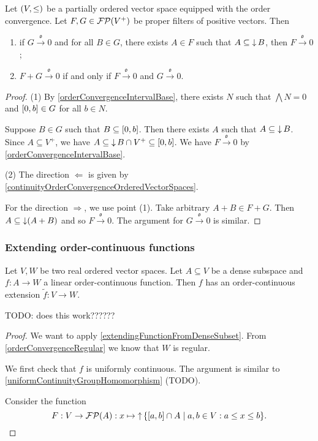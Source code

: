 \begin{lemma} \label{orderConvergencePositiveFilterLemma}
Let $\sSet{V, \leq}$ be a partially ordered vector space equipped with the order convergence. Let $F, G\in\operatorname{\mathcal{FP}}(V^+)$ be proper filters of positive vectors. Then
\begin{enumerate}
\item if $G \overset{\mathfrak{o}}{\longrightarrow} 0$ and for all $B\in G$, there exists $A\in F$ such that $A\subseteq \operatorname{\downarrow} B$, then $F \overset{\mathfrak{o}}{\longrightarrow} 0$;
\item $F+G \overset{\mathfrak{o}}{\longrightarrow} 0$ \textup{if and only if} $F \overset{\mathfrak{o}}{\longrightarrow} 0$ and $G \overset{\mathfrak{o}}{\longrightarrow} 0$.
\end{enumerate}
\end{lemma}
\begin{proof}
(1) By \ref{orderConvergenceIntervalBase}, there exists $N$ such that $\bigwedge N = 0$ and $\interval{0,b} \in G$ for all $b\in N$.

Suppose $B\in G$ such that $B\subseteq \interval{0,b}$. Then there exists $A$ such that $A\subseteq \operatorname{\downarrow} B$. Since $A\subseteq V^+$, we have $A \subseteq \downset B \cap V^+ \subseteq \interval{0,b}$. We have $F \overset{\mathfrak{o}}{\longrightarrow} 0$ by \ref{orderConvergenceIntervalBase}.

(2) The direction $\Leftarrow$ is given by \ref{continuityOrderConvergenceOrderedVectorSpaces}.

For the direction $\Rightarrow$, we use point (1). Take arbitrary $A+B\in F + G$. Then $A\subseteq \operatorname{\downarrow} (A+B)$ and so $F \overset{\mathfrak{o}}{\longrightarrow} 0$. The argument for $G \overset{\mathfrak{o}}{\longrightarrow} 0$ is similar.
\end{proof}

\subsubsection{Extending order-continuous functions}

\begin{proposition}
Let $V,W$ be two real ordered vector spaces. Let $A\subseteq V$ be a dense subspace and $f:A\to W$ a linear order-continuous function. Then $f$ has an order-continuous extension $\tilde{f}: V\to W$.
\end{proposition}
TODO: does this work??????
\begin{proof}
We want to apply \ref{extendingFunctionFromDenseSubset}. From \ref{orderConvergenceRegular} we know that $W$ is regular.

We first check that $f$ is uniformly continuous. The argument is similar to \ref{uniformContinuityGroupHomomorphism} (TODO).

Consider the function
\[ F: V\to \powerfilters(A): x\mapsto \upset\setbuilder{\interval{a,b} \cap A}{a,b\in V: a \leq x \leq b}. \]


\end{proof}

